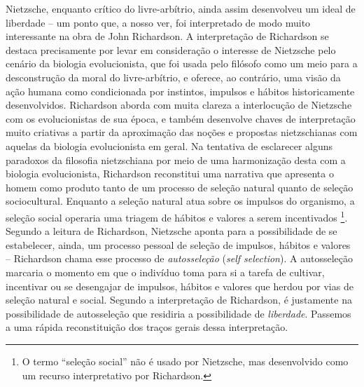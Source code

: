 \documentclass[
	12pt,				%
	openright,			%
	oneside,			%
	a4paper,			%
	english,			%
	french,				%
	spanish,			%
	brazil				%
	]{abntex2}
\begin{document}
	Nietzsche, enquanto crítico do livre-arbítrio, ainda assim desenvolveu um ideal de liberdade – um ponto que, a nosso ver, foi interpretado de modo muito interessante na obra de John Richardson. A interpretação de Richardson se destaca precisamente por levar em consideração o interesse de Nietzsche pelo cenário da biologia evolucionista, que foi usada pelo filósofo como um meio para a desconstrução da moral do livre-arbítrio, e oferece, ao contrário, uma visão da ação humana como condicionada por instintos, impulsos e hábitos historicamente desenvolvidos. Richardson aborda com muita clareza a interlocução de Nietzsche com os evolucionistas de sua época, e também desenvolve chaves de interpretação muito criativas a partir da aproximação das noções e propostas nietzschianas com aquelas da biologia evolucionista em geral. Na tentativa de esclarecer alguns paradoxos da filosofia nietzschiana por meio de uma harmonização desta com a biologia evolucionista, Richardson reconstitui uma narrativa que apresenta o homem como produto tanto de um processo de seleção natural quanto de seleção sociocultural. Enquanto a seleção natural atua sobre os impulsos do organismo, a seleção social operaria uma triagem de hábitos e valores a serem incentivados
\footnote{O termo “seleção social” não é usado por Nietzsche, mas desenvolvido como um recurso interpretativo por Richardson. }. 
Segundo a leitura de Richardson, Nietzsche aponta para a possibilidade de se estabelecer, ainda, um processo pessoal de seleção de impulsos, hábitos e valores – Richardson chama esse processo de \textit{autosseleção} (\textit{self selection}). A autosseleção marcaria o momento em que o indivíduo toma para si a tarefa de cultivar, incentivar ou se desengajar de impulsos, hábitos e valores que herdou por vias de seleção natural e social. Segundo a interpretação de Richardson, é justamente na possibilidade de autosseleção que residiria a possibilidade de \textit{liberdade}. Passemos a uma rápida reconstituição dos traços gerais dessa interpretação.
\end{document}
